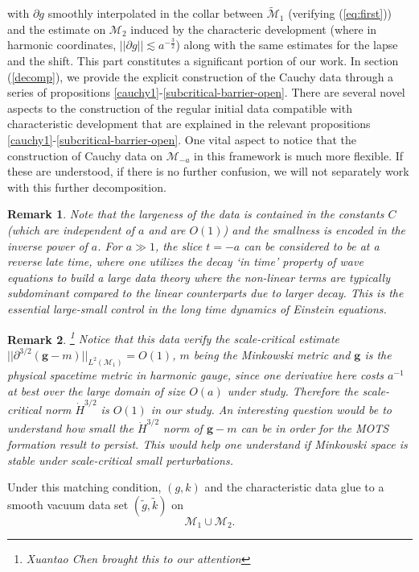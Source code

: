 \documentclass{amsart}
\newtheorem{remark}{Remark}
\begin{document}
with $\partial g$ smoothly interpolated in the collar between $\widetilde{\mathcal{M}}_{1}$ (verifying (\ref{eq:first})) and the estimate on $\mathcal{M}_{2}$ induced by the characteric development (where in harmonic coordinates, $||\partial g||\lesssim a^{-\frac{3}{2}}$) along with the same estimates for the lapse and the shift. This part constitutes a significant portion of our work. In section (\ref{decomp}), we provide the explicit construction of the Cauchy data through a series of propositions \ref{cauchy1}-\ref{subcritical-barrier-open}. There are several novel aspects to the construction of the regular initial data compatible with characteristic development that are explained in the relevant propositions \ref{cauchy1}-\ref{subcritical-barrier-open}. One vital aspect to notice that the construction of Cauchy data on $\mathcal{M}_{-a}$ in this framework is much more flexible. If these are understood, if there is no further confusion, we will not separately work with this further decomposition. 
\begin{remark}
Note that the largeness of the data is contained in the constants $C$ (which are independent of $a$ and are $O(1)$) and the smallness is encoded in the inverse power of $a$. For $a\gg1$, the slice $t=-a$ can be considered to be at a reverse late time, where one utilizes the decay `in time' property of wave equations to build a large data theory where the non-linear terms are typically subdominant compared to the linear counterparts due to larger decay. This is the essential large-small control in the long time dynamics of Einstein equations.  
\end{remark}


\begin{remark}\footnote{Xuantao Chen brought this to our attention}
Notice that this data verify the scale-critical estimate $||\partial^{3/2}(\mathbf{g}-m)||_{L^{2}(\mathcal{M}_{1})}=O(1)$, $m$ being the Minkowski metric and $\mathbf{g}$ is the physical spacetime metric in harmonic gauge, since one derivative here costs $a^{-1}$ at best over the large domain of size $O(a)$ under study. Therefore the scale-critical norm $\dot{H}^{3/2}$ is $O(1)$ in our study. An interesting question would be to understand how small the $\dot{H}^{3/2}$ norm of $\mathbf{g}-m$ can be in order for the MOTS formation result to persist. This would help one understand if Minkowski space is stable under scale-critical small perturbations.      
\end{remark}


\noindent Under this matching condition, $(g,k)$ and the characteristic data glue to a smooth vacuum data set
$(\tilde g,\tilde k)$ on
\[
\mathcal M_{1}\cup \mathcal M_{2}.
\]
\end{document}
